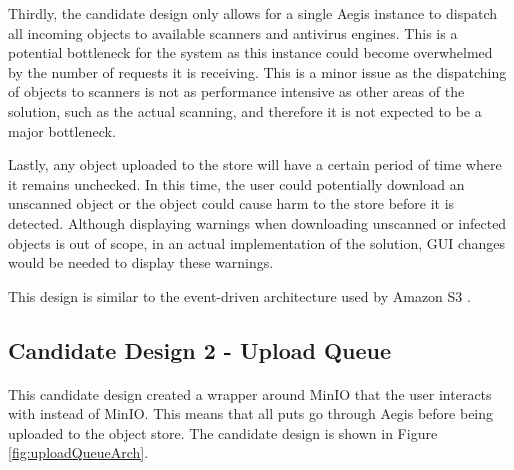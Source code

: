 \documentclass[12pt, conference, final, a4paper, onecolumn, compsoc]{IEEEtran}
\begin{document}
Thirdly, the candidate design only allows for a single Aegis instance to
dispatch all incoming objects to available scanners and antivirus engines. This
is a potential bottleneck for the system as this instance could become
overwhelmed by the number of requests it is receiving. This is a minor issue as
the dispatching of objects to scanners is not as performance intensive as other
areas of the solution, such as the actual scanning, and therefore it is not
expected to be a major bottleneck.

Lastly, any object uploaded to the store will have a certain period of time
where it remains unchecked. In this time, the user could potentially download an
unscanned object or the object could cause harm to the store before it is
detected. Although displaying warnings when downloading unscanned or infected objects is out
of scope, in an actual implementation of the solution, GUI changes would be
needed to display these warnings.

This design is similar to the event-driven architecture used by Amazon S3 \citep{amazon-md}.

\subsection{Candidate Design 2 - Upload Queue}
\paragraph{}

This candidate design created a wrapper around MinIO that the user interacts
with instead of MinIO. This means that all puts go through Aegis before being
uploaded to the object store. The candidate design is shown in Figure
\ref{fig:uploadQueueArch}.
\end{document}
